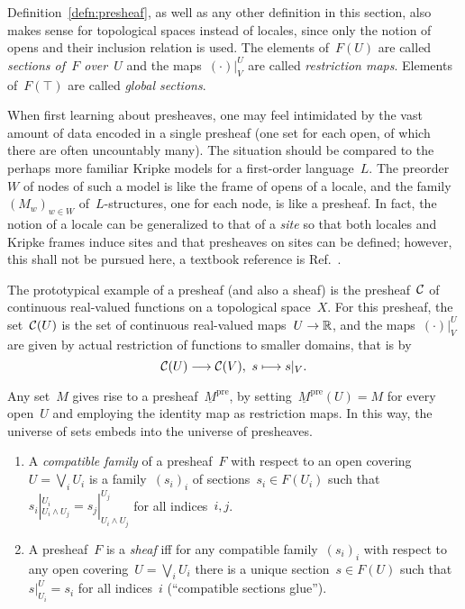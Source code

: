 \documentclass{ws-rv9x6}
\begin{document}
{Definition~\ref{defn:presheaf}, as well as any other definition in this section,
also makes sense for topological spaces instead of locales, since only the
notion of opens and their inclusion relation is used. The elements of~$F(U)$ are
called \emph{sections of~$F$ over~$U$} and the maps~$(\cdot)|^U_V$
are called \emph{restriction maps}. Elements of~$F(\top)$ are called
\emph{global sections}.

When first learning about presheaves, one may feel intimidated by the vast
amount of data encoded in a single presheaf (one set for each open, of which there are often uncountably many). The
situation should be compared to the perhaps more familiar Kripke models for a first-order language~$L$. The
preorder~$W$ of nodes of such a model is like the frame of opens of a locale, and the
family~$(M_w)_{w \in W}$ of~$L$-structures, one for each node, is like a
presheaf. In fact, the notion of a locale can be generalized to that of a
\emph{site} so that both locales and Kripke frames induce sites and that
presheaves on sites can be defined; however, this shall not be pursued here,
a textbook reference is Ref.~.

The prototypical example of a presheaf (and also a sheaf) is the presheaf~$\mathcal{C}$ of
continuous real-valued functions on a topological space~$X$. For this presheaf, the
set~$\mathcal{C}(U)$ is the set of continuous real-valued maps~$U \to \mathbb{R}$, and the
maps~$(\cdot)|^U_V$ are given by actual restriction of functions to smaller
domains, that is by
\[ \mathcal{C}(U) \longrightarrow \mathcal{C}(V),\ s \longmapsto s|_V. \]

Any set~$M$ gives rise to a presheaf~$\underline{M}^\mathrm{pre}$, by
setting~$\underline{M}^\mathrm{pre}(U) = M$ for every open~$U$ and employing
the identity map as restriction maps. In this way, the universe of sets embeds
into the universe of presheaves.

\begin{definition}
\begin{enumerate}
\item A \emph{compatible family} of a presheaf~$F$ with respect to an open
covering~$U = \bigvee_i U_i$ is a family~$(s_i)_i$ of sections~$s_i \in F(U_i)$
such that~$s_i|^{U_i}_{U_i \wedge U_j} = s_j|^{U_j}_{U_i \wedge U_j}$ for all
indices~$i,j$.
\item A presheaf~$F$ is a \emph{sheaf}
iff for any compatible family~$(s_i)_i$ with respect to any open covering~$U =
\bigvee_i U_i$ there is a unique section~$s \in F(U)$ such
that~$s|^U_{U_i} = s_i$ for all indices~$i$ (``compatible sections glue'').
\end{enumerate}
\end{definition}

}
\end{document}
